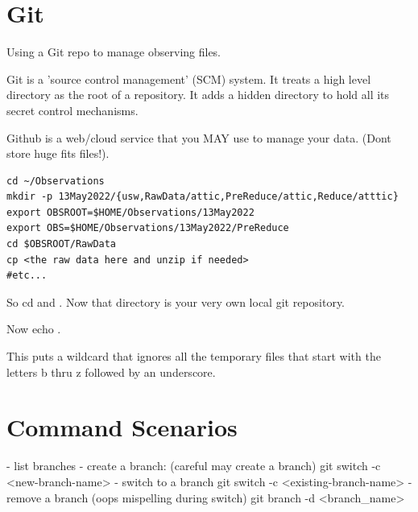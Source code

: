 
\renewcommand{\footerfilename}{Git.tex}

\section{Git}

Using a Git repo to manage observing files.

Git is a 'source control management' (SCM) system. It treats a high
level directory as the root of a repository. It adds a hidden directory
 to hold all its secret control mechanisms.

Github is a web/cloud service that you MAY use to manage your data.
(Dont store huge fits files!). 

\begingroup \fontsize{10pt}{10pt}
\selectfont
\begin{verbatim} 
cd ~/Observations
mkdir -p 13May2022/{usw,RawData/attic,PreReduce/attic,Reduce/atttic}
export OBSROOT=$HOME/Observations/13May2022
export OBS=$HOME/Observations/13May2022/PreReduce
cd $OBSROOT/RawData
cp <the raw data here and unzip if needed>
#etc...
\end{verbatim}
\endgroup

So cd  and .
Now that directory is your very own local git repository.

Now echo .

This puts a wildcard that ignores all the temporary files
that start with the letters b thru z followed by an
underscore. 

\section{Command Scenarios}


- list branches
- create a branch:  (careful may create a branch)
     git switch -c <new-branch-name>
- switch to a branch
     git switch -c <existing-branch-name>
- remove a branch (oops mispelling during switch)
     git branch -d <branch_name>








%

